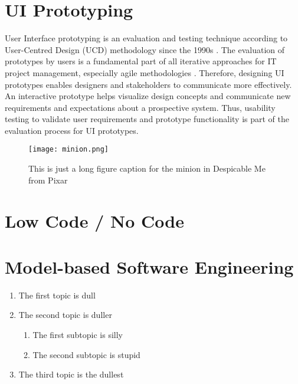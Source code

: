 \section{UI Prototyping}
\label{background:section:uiprototyping}
User Interface prototyping is an evaluation and testing technique according to User-Centred Design (UCD) methodology since the 1990s \cite{article:prototyping:preece}. 
The evaluation of prototypes by users is a fundamental part of all iterative approaches for IT project management, especially agile methodologies \cite{article:prototyping:schwaber}.
Therefore, designing UI prototypes enables designers and stakeholders to communicate more effectively.
An interactive prototype helps visualize design concepts and communicate new requirements and expectations about a prospective system.
Thus, usability testing to validate user requirements and prototype functionality is part of the evaluation process for UI prototypes.

\begin{figure}[htbp!]
\centering    
\texttt{[image: minion.png]}
\caption[Minion]{This is just a long figure caption for the minion in Despicable Me from Pixar}
\label{fig:minion}
\end{figure}

\section{Low Code / No Code}
\label{background:section:lowcode}

\section{Model-based Software Engineering}
\label{background:section:mbse}

\begin{enumerate}
\item The first topic is dull
\item The second topic is duller
\begin{enumerate}
\item The first subtopic is silly
\item The second subtopic is stupid
\end{enumerate}
\item The third topic is the dullest
\end{enumerate}

